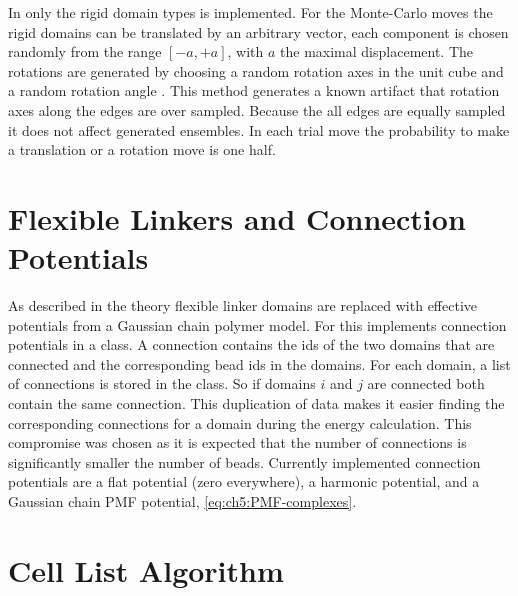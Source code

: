 \documentclass[12pt, twoside]{report}
\begin{document}
In \complexes only the rigid domain types is implemented. For the Monte-Carlo
moves the rigid domains can be translated by an arbitrary vector, each component
is chosen randomly from the range \([-a, +a]\), with \(a\) the maximal
displacement. The rotations are generated by choosing a random rotation axes in
the unit cube and a random rotation angle \cite{frenkel2001understanding}. This
method generates a known artifact that rotation axes along the edges are over
sampled. Because the all edges are equally sampled it does not affect generated
ensembles. In each trial move the probability to make a translation or a
rotation move is one half.

\section{Flexible Linkers and Connection Potentials}
As described in the theory flexible linker domains are replaced with effective
potentials from a Gaussian chain polymer model. For this \complexes implements
connection potentials in a  class. A connection contains
the ids of the two domains that are connected and the corresponding bead ids in
the domains. For each domain, a list of connections is stored in the class. So
if domains \(i\) and \(j\) are connected both contain the same connection. This
duplication of data makes it easier finding the corresponding connections for a
domain during the energy calculation. This compromise was chosen as it is
expected that the number of connections is significantly smaller the number of
beads. Currently implemented connection potentials are a flat potential (zero
everywhere), a harmonic potential, and a Gaussian chain \gls{PMF} potential,
\cref{eq:ch5:PMF-complexes}.

\section{Cell List Algorithm}
\end{document}
